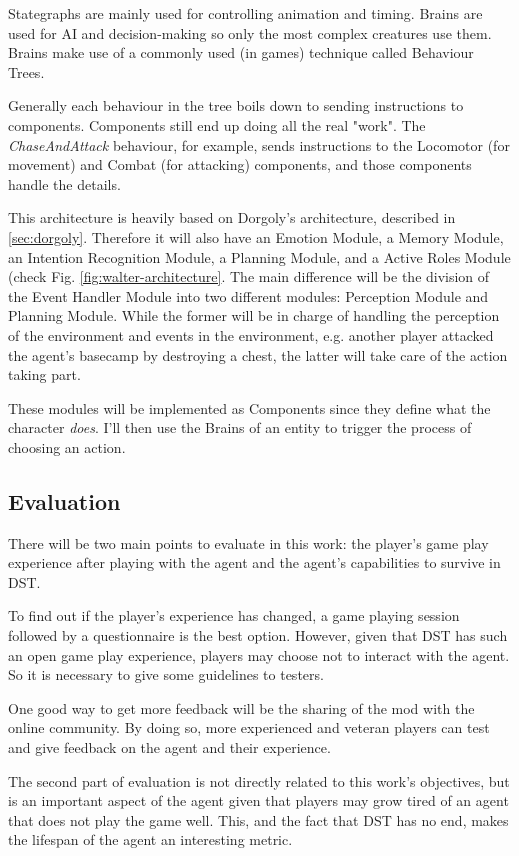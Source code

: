 Stategraphs are mainly used for controlling animation and timing.
Brains are used for AI and decision-making so only the most complex creatures use them.
Brains make use of a commonly used (in games) technique called Behaviour Trees.

Generally each behaviour in the tree boils down to sending instructions to components.
Components still end up doing all the real "work".
The \textit{ChaseAndAttack} behaviour, for example, sends instructions to the Locomotor (for movement) and Combat (for attacking) components, and those components handle the details.

This architecture is heavily based on Dorgoly's architecture, described in \ref{sec:dorgoly}.
Therefore it will also have an Emotion Module, a Memory Module, an Intention Recognition Module, a Planning Module, and a Active Roles Module (check Fig. \ref{fig:walter-architecture}.
The main difference will be the division of the Event Handler Module into two different modules: Perception Module and Planning Module.
While the former will be in charge of handling the perception of the environment and events in the environment, e.g. another player attacked the agent's basecamp by destroying a chest, the latter will take care of the action taking part.

These modules will be implemented as Components since they define what the character \textit{does}.
I'll then use the Brains of an entity to trigger the process of choosing an action.

\subsection{Evaluation}
There will be two main points to evaluate in this work: the player's game play experience after playing with the agent and the agent's capabilities to survive in \ac{DST}.

To find out if the player's experience has changed, a game playing session followed by a questionnaire is the best option.
However, given that \ac{DST} has such an open game play experience, players may choose not to interact with the agent.
So it is necessary to give some guidelines to testers.

One good way to get more feedback will be the sharing of the mod with the online community.
By doing so, more experienced and veteran players can test and give feedback on the agent and their experience.

The second part of evaluation is not directly related to this work's objectives, but is an important aspect of the agent given that players may grow tired of an agent that does not play the game well.
This, and the fact that \ac{DST} has no end, makes the lifespan of the agent an interesting metric.


